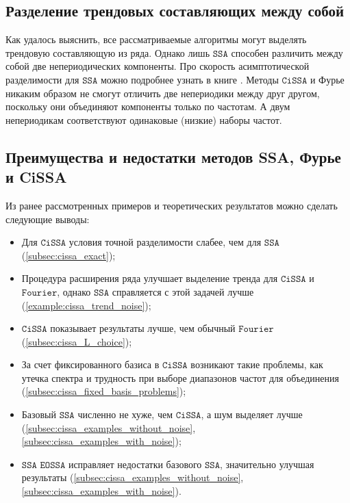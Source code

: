 \documentclass[12pt, specialist, subf
]{disser}
\theoremstyle{definition}
\newcommand{\SSA}{\texttt{SSA}}
\newcommand{\EOSSA}{\texttt{SSA EOSSA}}
\newcommand{\CISSA}{\texttt{CiSSA}}
\newcommand{\FOURIER}{\texttt{Fourier}}
\begin{document}
\subsection{Разделение трендовых составляющих между собой}
\label{subsubsec:nonperiodic}

Как удалось выяснить, все рассматриваемые алгоритмы могут выделять трендовую составляющую из ряда. Однако лишь $\SSA$ способен различить между собой две непериодических компоненты. Про скорость асимптотической разделимости для $\SSA$ можно подробнее узнать в книге \cite{golyandina2001analysis}. Методы $\CISSA$ и Фурье никаким образом не смогут отличить две непериодики между друг другом, поскольку они объединяют компоненты только по частотам. А двум непериодикам соответствуют одинаковые (низкие) наборы частот.


\subsection{Преимущества и недостатки методов SSA, Фурье и CiSSA}


Из ранее рассмотренных примеров и теоретических результатов можно сделать следующие выводы:

\begin{itemize}
	\item Для $\CISSA$ условия точной разделимости слабее, чем для $\SSA$ (\ref{subsec:cissa_exact});
	\item Процедура расширения ряда улучшает выделение тренда для $\CISSA$ и $\FOURIER$, однако $\SSA$ справляется с этой задачей лучше (\ref{example:cissa_trend_noise});
	\item $\CISSA$ показывает результаты лучше, чем обычный $\FOURIER$ (\ref{subsec:cissa_L_choice});
	\item За счет фиксированного базиса в $\CISSA$ возникают такие проблемы, как утечка спектра и трудность при выборе диапазонов частот для объединения (\ref{subsec:cissa_fixed_basis_problems});
	\item Базовый $\SSA$ численно не хуже, чем $\CISSA$, а шум выделяет лучше (\ref{subsec:cissa_examples_without_noise}, \ref{subsec:cissa_examples_with_noise});
	\item $\EOSSA$ исправляет недостатки базового $\SSA$, значительно улучшая результаты (\ref{subsec:cissa_examples_without_noise}, \ref{subsec:cissa_examples_with_noise}). 
\end{itemize}
\end{document}
